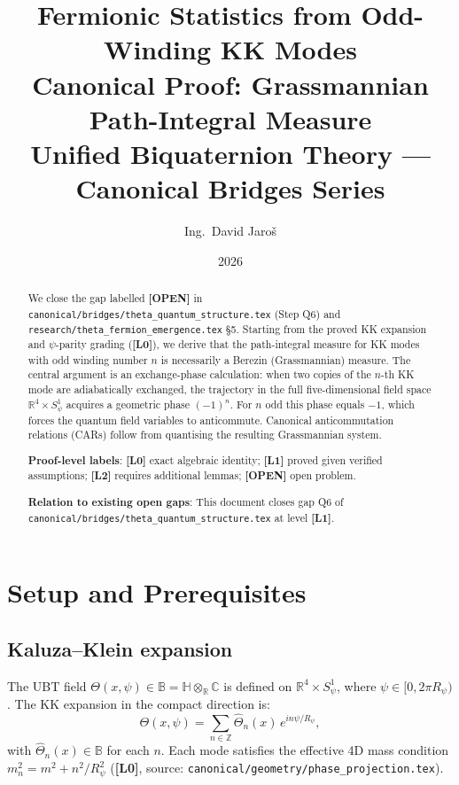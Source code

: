 \documentclass[11pt,a4paper]{article}
\title{Fermionic Statistics from Odd-Winding KK Modes\\
\large Canonical Proof: Grassmannian Path-Integral Measure\\
Unified Biquaternion Theory — Canonical Bridges Series}
\author{Ing.\ David Jaroš}
\date{2026}
\newcommand{\Lzero}{\textbf{[L0]}}
\newcommand{\Lone}{\textbf{[L1]}}
\newcommand{\Ltwo}{\textbf{[L2]}}
\newcommand{\OPEN}{\textbf{[OPEN]}}
\begin{document}
\maketitle

\begin{abstract}
We close the gap labelled \OPEN{} in
\texttt{canonical/bridges/theta\_quantum\_structure.tex} (Step Q6) and
\texttt{research/theta\_fermion\_emergence.tex} §5.
Starting from the proved KK expansion and $\psi$-parity grading (\Lzero),
we derive that the path-integral measure for KK modes with odd winding number
$n$ is necessarily a Berezin (Grassmannian) measure.
The central argument is an exchange-phase calculation: when two copies of the
$n$-th KK mode are adiabatically exchanged, the trajectory in the full
five-dimensional field space $\mathbb{R}^4\times S^1_\psi$ acquires a geometric
phase $(-1)^n$.  For $n$ odd this phase equals $-1$, which forces the quantum
field variables to anticommute.  Canonical anticommutation relations (CARs)
follow from quantising the resulting Grassmannian system.

\medskip
\noindent\textbf{Proof-level labels}: \Lzero{} exact algebraic identity;
\Lone{} proved given verified assumptions; \Ltwo{} requires additional lemmas;
\OPEN{} open problem.

\medskip
\noindent\textbf{Relation to existing open gaps}:
This document closes gap Q6 of \texttt{canonical/bridges/theta\_quantum\_structure.tex}
at level \Lone{}.
\end{abstract}

\tableofcontents
\newpage

\section{Setup and Prerequisites}
\label{sec:setup}

\subsection{Kaluza--Klein expansion}

The UBT field $\Theta(x,\psi)\in\mathbb{B}=\mathbb{H}\otimes_{\mathbb{R}}\mathbb{C}$
is defined on $\mathbb{R}^4\times S^1_\psi$, where $\psi\in[0,2\pi R_\psi)$.
The KK expansion in the compact direction is:
\begin{equation}
\label{eq:kk}
  \Theta(x,\psi)
  = \sum_{n\in\mathbb{Z}} \hat\Theta_n(x)\,e^{in\psi/R_\psi},
\end{equation}
with $\hat\Theta_n(x)\in\mathbb{B}$ for each $n$.
Each mode satisfies the effective 4D mass condition
$m_n^2 = m^2 + n^2/R_\psi^2$ (\Lzero, source:
\texttt{canonical/geometry/phase\_projection.tex}).
\end{document}
